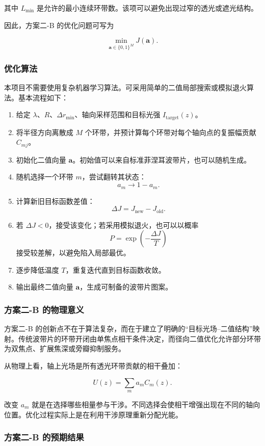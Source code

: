 \documentclass[UTF8,a4paper,11pt]{ctexart}
\begin{document}
其中 $L_{\min}$ 是允许的最小连续环带数。该项可以避免出现过窄的透光或遮光结构。

因此，方案二-B 的优化问题可写为

\[
\min_{\bm a\in\{0,1\}^{M}} J(\bm a).
\]

\subsubsection{优化算法}

本项目不需要使用复杂机器学习算法。可采用简单的二值局部搜索或模拟退火算法。基本流程如下：

\begin{enumerate}[label=\textbf{Step \arabic*:}]
\item 给定 $\lambda$、$R$、$\Delta r_{\min}$、轴向采样范围和目标光强 $I_{\mathrm{target}}(z)$。
\item 将半径方向离散成 $M$ 个环带，并预计算每个环带对每个轴向点的复振幅贡献 $C_{mj}$。
\item 初始化二值向量 $\bm a$。初始值可以来自标准菲涅耳波带片，也可以随机生成。
\item 随机选择一个环带 $m$，尝试翻转其状态：
\[
a_m\rightarrow 1-a_m.
\]
\item 计算新旧目标函数差值：
\[
\Delta J=J_{\mathrm{new}}-J_{\mathrm{old}}.
\]
\item 若 $\Delta J<0$，接受该变化；若采用模拟退火，也可以以概率
\[
P=\exp\left(-\frac{\Delta J}{T}\right)
\]
接受较差解，以避免陷入局部最优。
\item 逐步降低温度 $T$，重复迭代直到目标函数收敛。
\item 输出最终二值向量 $\bm a$，生成可制备的波带片图案。
\end{enumerate}

\subsubsection{方案二-B 的物理意义}

方案二-B 的创新点不在于算法复杂，而在于建立了明确的“目标光场--二值结构”映射。传统波带片的环带开闭由单焦点相干条件决定，而径向二值优化允许部分环带为双焦点、扩展焦深或旁瓣抑制服务。

从物理上看，轴上光场是所有透光环带贡献的相干叠加：

\[
U(z)=\sum_m a_m C_m(z).
\]

改变 $a_m$ 就是在选择哪些相量参与干涉。不同选择会使相干增强出现在不同的轴向位置。优化过程实际上是在利用干涉原理重新分配光能。

\subsubsection{方案二-B 的预期结果}
\end{document}
